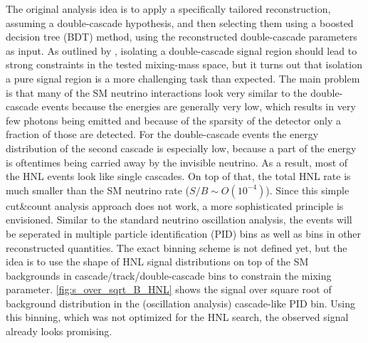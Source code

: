 \documentclass[a4paper,11pt]{article}
\begin{document}
The original analysis idea is to apply a specifically tailored reconstruction, assuming a double-cascade hypothesis, and then selecting them using a boosted decision tree (BDT) method, using the reconstructed double-cascade parameters as input. As outlined by \cite{Coloma:2017ppo}, isolating a double-cascade signal region should lead to strong constraints in the tested mixing-mass space, but it turns out that isolation a pure signal region is a more challenging task than expected. The main problem is that many of the SM neutrino interactions look very similar to the double-cascade events because the energies are generally very low, which results in very few photons being emitted and because of the sparsity of the detector only a fraction of those are detected. For the double-cascade events the energy distribution of the second cascade is especially low, because a part of the energy is oftentimes being carried away by the invisible neutrino. As a result, most of the HNL events look like single cascades. On top of that, the total HNL rate is much smaller than the SM neutrino rate ($S/B\sim O(10^{-4})$). Since this simple cut\&count analysis approach does not work, a more sophisticated principle is envisioned. Similar to the standard neutrino oscillation analysis, the events will be seperated in multiple particle identification (PID) bins as well as bins in other reconstructed quantities. The exact binning scheme is not defined yet, but the idea is to use the shape of HNL signal distributions on top of the SM backgrounds in cascade/track/double-cascade bins to constrain the mixing parameter. \cref{fig:s_over_sqrt_B_HNL} shows the signal over square root of background distribution in the (oscillation analysis) cascade-like PID bin. Using this binning, which was not optimized for the HNL search, the observed signal already looks promising.

\footnotesize


\end{document}
